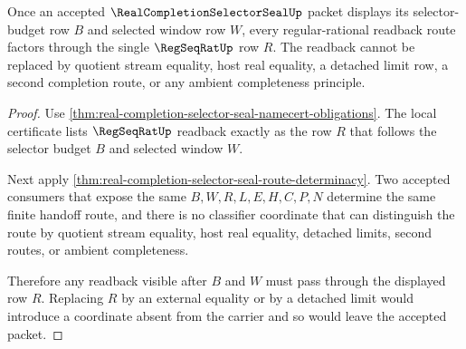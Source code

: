 \begin{theorem}
\label{thm:real-completion-selector-seal-regseq-readback-exactness}
Once an accepted $\RealCompletionSelectorSealUp$ packet displays its selector-budget row $B$ and selected window row $W$, every regular-rational readback route factors through the single $\RegSeqRatUp$ row $R$. The readback cannot be replaced by quotient stream equality, host real equality, a detached limit row, a second completion route, or any ambient completeness principle.
\end{theorem}
\begin{proof}
Use \autoref{thm:real-completion-selector-seal-namecert-obligations}. The local certificate lists $\RegSeqRatUp$ readback exactly as the row $R$ that follows the selector budget $B$ and selected window $W$.

Next apply \autoref{thm:real-completion-selector-seal-route-determinacy}. Two accepted consumers that expose the same $B,W,R,L,E,H,C,P,N$ determine the same finite handoff route, and there is no classifier coordinate that can distinguish the route by quotient stream equality, host real equality, detached limits, second routes, or ambient completeness.

Therefore any readback visible after $B$ and $W$ must pass through the displayed row $R$. Replacing $R$ by an external equality or by a detached limit would introduce a coordinate absent from the carrier and so would leave the accepted packet.
\end{proof}

